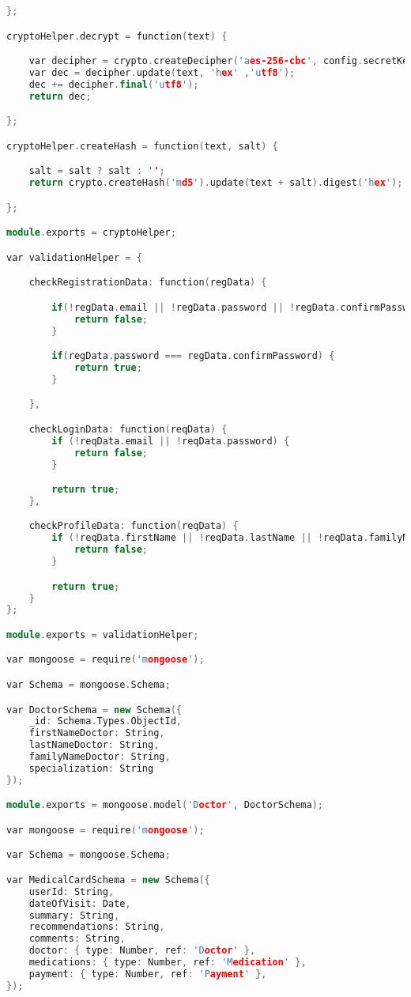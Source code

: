 \begin{lstlisting}[language=C++, style=cplusplusstyle]
};

cryptoHelper.decrypt = function(text) {

    var decipher = crypto.createDecipher('aes-256-cbc', config.secretKey);
    var dec = decipher.update(text, 'hex' ,'utf8');
    dec += decipher.final('utf8');
    return dec;

};

cryptoHelper.createHash = function(text, salt) {

    salt = salt ? salt : '';
    return crypto.createHash('md5').update(text + salt).digest('hex');

};

module.exports = cryptoHelper;

var validationHelper = {

    checkRegistrationData: function(regData) {

        if(!regData.email || !regData.password || !regData.confirmPassword) {
            return false;
        }

        if(regData.password === regData.confirmPassword) {
            return true;
        }

    },

    checkLoginData: function(reqData) {
        if (!reqData.email || !reqData.password) {
            return false;
        }

        return true;
    },

    checkProfileData: function(reqData) {
        if (!reqData.firstName || !reqData.lastName || !reqData.familyName || !reqData.gender || !reqData.dateOfBirth) {
            return false;
        }

        return true;
    }
};

module.exports = validationHelper;

var mongoose = require('mongoose');

var Schema = mongoose.Schema;

var DoctorSchema = new Schema({
    _id: Schema.Types.ObjectId,
    firstNameDoctor: String,
    lastNameDoctor: String,
    familyNameDoctor: String,
    specialization: String
});

module.exports = mongoose.model('Doctor', DoctorSchema);

var mongoose = require('mongoose');

var Schema = mongoose.Schema;

var MedicalCardSchema = new Schema({
    userId: String,
    dateOfVisit: Date,
    summary: String,
    recommendations: String,
    comments: String,
    doctor: { type: Number, ref: 'Doctor' },
    medications: { type: Number, ref: 'Medication' },
    payment: { type: Number, ref: 'Payment' },
});



\end{lstlisting}

